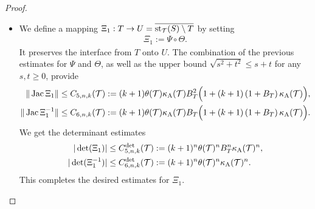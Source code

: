\documentclass[10pt,letterpaper]{article}
\begin{document}
\begin{proof}
\begin{itemize}
        
        
        
        \item 
        We define a mapping $ \Xi_{1} : T \rightarrow U = \overline{\operatorname{st}_{{\mathcal T}}(S) \setminus T}$ by setting 
        \begin{align*}
            \Xi_{1} := \Psi \circ \Theta.
        \end{align*}
        It preserves the interface from $T$ onto $U$. 
        The combination of the previous estimates for $\Psi$ and $\Theta$,
        as well as the upper bound $\sqrt{s^2+t^2} \leq s + t$ for any $s,t \geq 0$,
        provide 
        \begin{align*}
            \| \operatorname{{\rm Jac}} \Xi_{1} \|
            &\leq 
            C_{5,n,k}({\mathcal T})
            :=
            (k+1) 
            \theta({\mathcal T})
            \kappa_{{\rm A}}({\mathcal T})
            B_{T}^{2}
            \Big( 
                1 
                + 
                (k+1) 
                \left( 1 + B_{T} \right)
                \kappa_{{\rm A}}({\mathcal T})
            \Big)            
            ,
            \\
            \| \operatorname{{\rm Jac}} \Xi_{1}^{-1} \|
            &\leq  
            C_{6,n,k}({\mathcal T})
            :=
            (k+1) 
            \theta({\mathcal T})
            \kappa_{{\rm A}}({\mathcal T})
            B_{T}
            \Big( 
                1 
                + 
                (k+1) 
                \left( 1 + B_{T} \right)
                \kappa_{{\rm A}}({\mathcal T})
            \Big)            
            .
        \end{align*}
        We get the determinant estimates
        \begin{align*}
            |\det(\Xi_{1})|
            &\leq 
            C^{\det}_{5,n,k}({\mathcal T})
            :=
            (k+1)^{n}
            \theta({\mathcal T})^{n}
            B_{T}^{n}
            \kappa_{{\rm A}}({\mathcal T})^{n}
            ,
            \\
            |\det(\Xi_{1}^{-1})|
            &\leq 
            C^{\det}_{6,n,k}({\mathcal T})
            :=
            (k+1)^{n}
            \theta({\mathcal T})^{n}
            \kappa_{{\rm A}}({\mathcal T})^{n}
            .
        \end{align*}
        This completes the desired estimates for $\Xi_{1}$. 
        

\end{itemize}
\end{proof}
\end{document}
